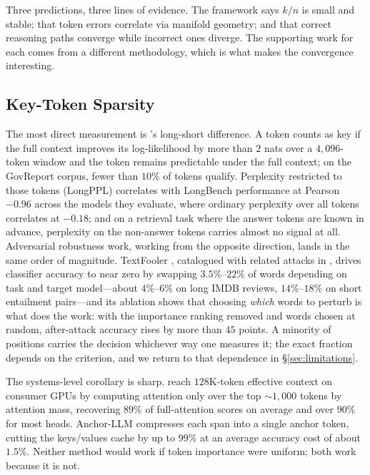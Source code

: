 Three predictions, three lines of evidence. The framework says $k/n$ is small and stable; that token errors correlate via manifold geometry; and that correct reasoning paths converge while incorrect ones diverge. The supporting work for each comes from a different methodology, which is what makes the convergence interesting.

\subsection{Key-Token Sparsity}

The most direct measurement is \citet{fang2024what}'s long-short difference. A token counts as key if the full context improves its log-likelihood by more than $2$ nats over a $4{,}096$-token window and the token remains predictable under the full context; on the GovReport corpus, fewer than $10\%$ of tokens qualify. Perplexity restricted to those tokens (LongPPL) correlates with LongBench performance at Pearson $-0.96$ across the models they evaluate, where ordinary perplexity over all tokens correlates at $-0.18$; and on a retrieval task where the answer tokens are known in advance, perplexity on the non-answer tokens carries almost no signal at all. Adversarial robustness work, working from the opposite direction, lands in the same order of magnitude. TextFooler \citep{jin2020textfooler}, catalogued with related attacks in \citet{morris2022textattack}, drives classifier accuracy to near zero by swapping $3.5\%$--$22\%$ of words depending on task and target model---about $4\%$--$6\%$ on long IMDB reviews, $14\%$--$18\%$ on short entailment pairs---and its ablation shows that choosing \emph{which} words to perturb is what does the work: with the importance ranking removed and words chosen at random, after-attack accuracy rises by more than $45$ points. A minority of positions carries the decision whichever way one measures it; the exact fraction depends on the criterion, and we return to that dependence in \S\ref{sec:limitations}.

The systems-level corollary is sharp. \citet{liu2024retrieval} reach $128$K-token effective context on consumer GPUs by computing attention only over the top $\sim 1{,}000$ tokens by attention mass, recovering $89\%$ of full-attention scores on average and over $90\%$ for most heads. Anchor-LLM \citep{pang2024anchor} compresses each span into a single anchor token, cutting the keys/values cache by up to $99\%$ at an average accuracy cost of about $1.5\%$. Neither method would work if token importance were uniform; both work because it is not.

